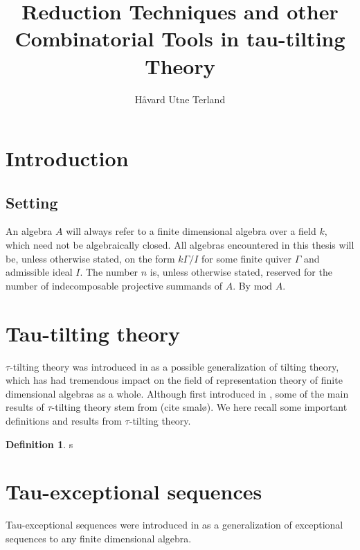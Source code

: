 \documentclass[]{article}
\title{Reduction Techniques and other Combinatorial Tools in tau-tilting Theory}
\author{Håvard Utne Terland}
\theoremstyle{definition}
\newtheorem{definition}{Definition}[section]
\newcommand{\mo}{\ensuremath{\text{mod }}}
\begin{document}
\maketitle

\begin{abstract}

\end{abstract}

\section{Introduction}


\subsection{Setting}
An algebra $A$ will always refer to a finite dimensional algebra over a field $k$, which need not be algebraically closed. All algebras encountered in this thesis will be, unless otherwise stated, on the form $k\Gamma/I$ for some finite quiver $\Gamma$ and admissible ideal $I$. The number $n$ is, unless otherwise stated, reserved for the number of indecomposable projective summands of $A$. By $\mo A$.


\section{Tau-tilting theory}
$\tau$-tilting theory was introduced in \cite{tau} as a possible generalization of tilting theory, which has had tremendous impact on the field of representation theory of finite dimensional algebras as a whole. Although first introduced in \cite{tau}, some of the main results of $\tau$-tilting theory stem from (cite smalø). We here recall some important definitions and results from $\tau$-tilting theory.


\begin{definition}
	s
\end{definition}


\section{Tau-exceptional sequences}
Tau-exceptional sequences were introduced in \cite{buantau2020} as a generalization of exceptional sequences to any finite dimensional algebra.





\printbibliography
\end{document}

